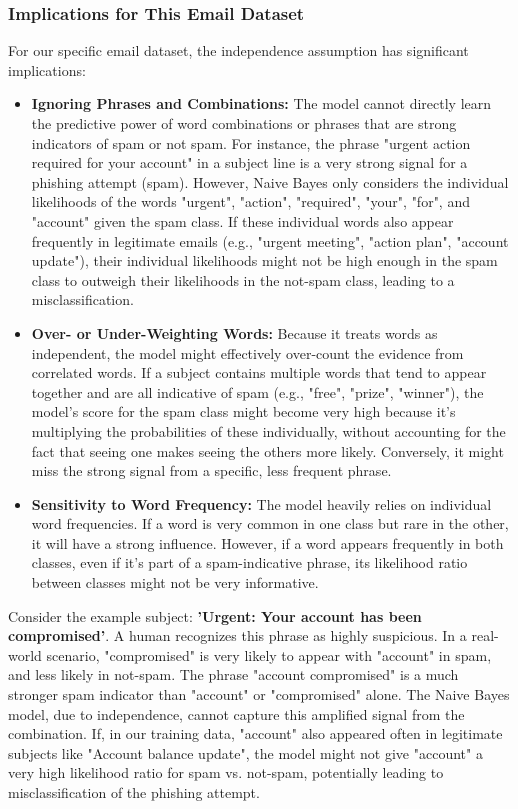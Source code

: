 \documentclass[12pt,a4paper]{article}
\begin{document}
\subsubsection{Implications for This Email Dataset}

For our specific email dataset, the independence assumption has significant implications:

\begin{itemize}
    \item \textbf{Ignoring Phrases and Combinations:} The model cannot directly learn the predictive power of word combinations or phrases that are strong indicators of spam or not spam. For instance, the phrase "urgent action required for your account" in a subject line is a very strong signal for a phishing attempt (spam). However, Naive Bayes only considers the individual likelihoods of the words "urgent", "action", "required", "your", "for", and "account" given the spam class. If these individual words also appear frequently in legitimate emails (e.g., "urgent meeting", "action plan", "account update"), their individual likelihoods might not be high enough in the spam class to outweigh their likelihoods in the not-spam class, leading to a misclassification.
    \item \textbf{Over- or Under-Weighting Words:} Because it treats words as independent, the model might effectively over-count the evidence from correlated words. If a subject contains multiple words that tend to appear together and are all indicative of spam (e.g., "free", "prize", "winner"), the model's score for the spam class might become very high because it's multiplying the probabilities of these individually, without accounting for the fact that seeing one makes seeing the others more likely. Conversely, it might miss the strong signal from a specific, less frequent phrase.
    \item \textbf{Sensitivity to Word Frequency:} The model heavily relies on individual word frequencies. If a word is very common in one class but rare in the other, it will have a strong influence. However, if a word appears frequently in both classes, even if it's part of a spam-indicative phrase, its likelihood ratio between classes might not be very informative.
\end{itemize}

Consider the example subject: \textbf{'Urgent: Your account has been compromised'}. A human recognizes this phrase as highly suspicious. In a real-world scenario, "compromised" is very likely to appear with "account" in spam, and less likely in not-spam. The phrase "account compromised" is a much stronger spam indicator than "account" or "compromised" alone. The Naive Bayes model, due to independence, cannot capture this amplified signal from the combination. If, in our training data, "account" also appeared often in legitimate subjects like "Account balance update", the model might not give "account" a very high likelihood ratio for spam vs. not-spam, potentially leading to misclassification of the phishing attempt.
\end{document}
